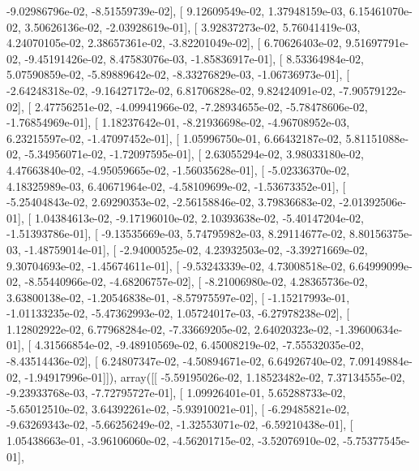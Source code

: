 \documentclass{article}
\begin{document}
         -9.02986796e-02,  -8.51559739e-02],
       [  9.12609549e-02,   1.37948159e-03,   6.15461070e-02,
          3.50626136e-02,  -2.03928619e-01],
       [  3.92837273e-02,   5.76041419e-03,   4.24070105e-02,
          2.38657361e-02,  -3.82201049e-02],
       [  6.70626403e-02,   9.51697791e-02,  -9.45191426e-02,
          8.47583076e-03,  -1.85836917e-01],
       [  8.53364984e-02,   5.07590859e-02,  -5.89889642e-02,
         -8.33276829e-03,  -1.06736973e-01],
       [ -2.64248318e-02,  -9.16427172e-02,   6.81706828e-02,
          9.82424091e-02,  -7.90579122e-02],
       [  2.47756251e-02,  -4.09941966e-02,  -7.28934655e-02,
         -5.78478606e-02,  -1.76854969e-01],
       [  1.18237642e-01,  -8.21936698e-02,  -4.96708952e-03,
          6.23215597e-02,  -1.47097452e-01],
       [  1.05996750e-01,   6.66432187e-02,   5.81151088e-02,
         -5.34956071e-02,  -1.72097595e-01],
       [  2.63055294e-02,   3.98033180e-02,   4.47663840e-02,
         -4.95059665e-02,  -1.56035628e-01],
       [ -5.02336370e-02,   4.18325989e-03,   6.40671964e-02,
         -4.58109699e-02,  -1.53673352e-01],
       [ -5.25404843e-02,   2.69290353e-02,  -2.56158846e-02,
          3.79836683e-02,  -2.01392506e-01],
       [  1.04384613e-02,  -9.17196010e-02,   2.10393638e-02,
         -5.40147204e-02,  -1.51393786e-01],
       [ -9.13535669e-03,   5.74795982e-03,   8.29114677e-02,
          8.80156375e-03,  -1.48759014e-01],
       [ -2.94000525e-02,   4.23932503e-02,  -3.39271669e-02,
          9.30704693e-02,  -1.45674611e-01],
       [ -9.53243339e-02,   4.73008518e-02,   6.64999099e-02,
         -8.55440966e-02,  -4.68206757e-02],
       [ -8.21006980e-02,   4.28365736e-02,   3.63800138e-02,
         -1.20546838e-01,  -8.57975597e-02],
       [ -1.15217993e-01,  -1.01133235e-02,  -5.47362993e-02,
          1.05724017e-03,  -6.27978238e-02],
       [  1.12802922e-02,   6.77968284e-02,  -7.33669205e-02,
          2.64020323e-02,  -1.39600634e-01],
       [  4.31566854e-02,  -9.48910569e-02,   6.45008219e-02,
         -7.55532035e-02,  -8.43514436e-02],
       [  6.24807347e-02,  -4.50894671e-02,   6.64926740e-02,
          7.09149884e-02,  -1.94917996e-01]]), array([[ -5.59195026e-02,   1.18523482e-02,   7.37134555e-02,
         -9.23933768e-03,  -7.72795727e-01],
       [  1.09926401e-01,   5.65288733e-02,  -5.65012510e-02,
          3.64392261e-02,  -5.93910021e-01],
       [ -6.29485821e-02,  -9.63269343e-02,  -5.66256249e-02,
         -1.32553071e-02,  -6.59210438e-01],
       [  1.05438663e-01,  -3.96106060e-02,  -4.56201715e-02,
         -3.52076910e-02,  -5.75377545e-01],
\end{document}
